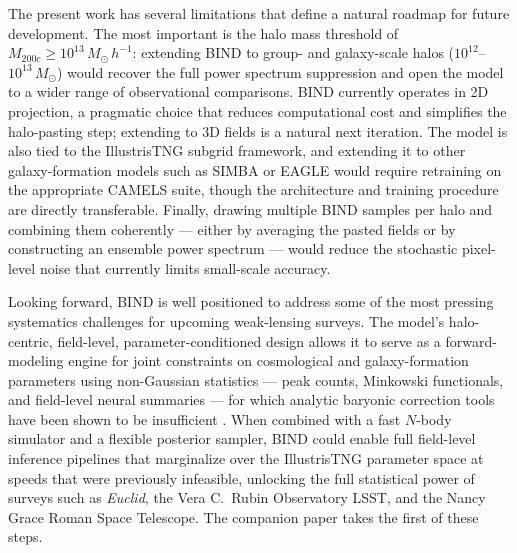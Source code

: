 \documentclass[linenumbers,trackchanges, twocolumn]{aastex701}
\begin{document}
The present work has several limitations that define a natural roadmap for future development. The most important is the halo mass threshold of $M_{200c} \geq 10^{13}\,M_\odot\,h^{-1}$: extending \textsc{BIND} to group- and galaxy-scale halos ($10^{12}$--$10^{13}\, M_\odot$) would recover the full power spectrum suppression and open the model to a wider range of observational comparisons. \textsc{BIND} currently operates in 2D projection, a pragmatic choice that reduces computational cost and simplifies the halo-pasting step; extending to 3D fields is a natural next iteration. The model is also tied to the IllustrisTNG subgrid framework, and extending it to other galaxy-formation models such as SIMBA or EAGLE would require retraining on the appropriate CAMELS suite, though the architecture and training procedure are directly transferable. Finally, drawing multiple \textsc{BIND} samples per halo and combining them coherently --- either by averaging the pasted fields or by constructing an ensemble power spectrum --- would reduce the stochastic pixel-level noise that currently limits small-scale accuracy.

Looking forward, \textsc{BIND} is well positioned to address some of the most pressing systematics challenges for upcoming weak-lensing surveys. The model's halo-centric, field-level, parameter-conditioned design allows it to serve as a forward-modeling engine for joint constraints on cosmological and galaxy-formation parameters using non-Gaussian statistics --- peak counts, Minkowski functionals, and field-level neural summaries --- for which analytic baryonic correction tools have been shown to be insufficient \citep{Lee-2023,Lee-2026a}. When combined with a fast $N$-body simulator and a flexible posterior sampler, \textsc{BIND} could enable full field-level inference pipelines that marginalize over the IllustrisTNG parameter space at speeds that were previously infeasible, unlocking the full statistical power of surveys such as \textit{Euclid}, the Vera C.\ Rubin Observatory LSST, and the Nancy Grace Roman Space Telescope. The companion paper \citep{Lee-2026c} takes the first of these steps.


\begin{acknowledgments}
\end{acknowledgments}
\end{document}

